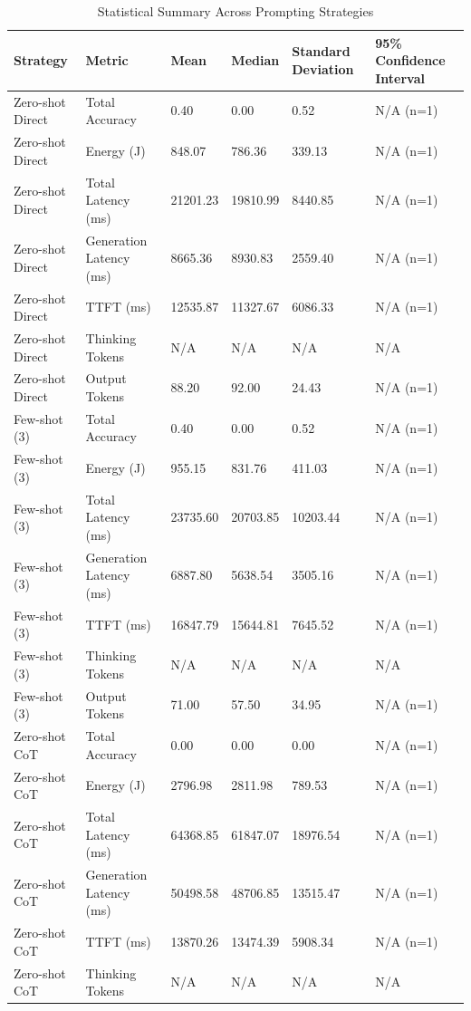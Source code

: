 \begin{table}
\caption{Statistical Summary Across Prompting Strategies}
\label{tab:statistical_summary}
\begin{tabular}{llllll}
\toprule
Strategy & Metric & Mean & Median & Standard Deviation & 95\% Confidence Interval \\
\midrule
Zero-shot Direct & Total Accuracy & 0.40 & 0.00 & 0.52 & N/A (n=1) \\
Zero-shot Direct & Energy (J) & 848.07 & 786.36 & 339.13 & N/A (n=1) \\
Zero-shot Direct & Total Latency (ms) & 21201.23 & 19810.99 & 8440.85 & N/A (n=1) \\
Zero-shot Direct & Generation Latency (ms) & 8665.36 & 8930.83 & 2559.40 & N/A (n=1) \\
Zero-shot Direct & TTFT (ms) & 12535.87 & 11327.67 & 6086.33 & N/A (n=1) \\
Zero-shot Direct & Thinking Tokens & N/A & N/A & N/A & N/A \\
Zero-shot Direct & Output Tokens & 88.20 & 92.00 & 24.43 & N/A (n=1) \\
Few-shot (3) & Total Accuracy & 0.40 & 0.00 & 0.52 & N/A (n=1) \\
Few-shot (3) & Energy (J) & 955.15 & 831.76 & 411.03 & N/A (n=1) \\
Few-shot (3) & Total Latency (ms) & 23735.60 & 20703.85 & 10203.44 & N/A (n=1) \\
Few-shot (3) & Generation Latency (ms) & 6887.80 & 5638.54 & 3505.16 & N/A (n=1) \\
Few-shot (3) & TTFT (ms) & 16847.79 & 15644.81 & 7645.52 & N/A (n=1) \\
Few-shot (3) & Thinking Tokens & N/A & N/A & N/A & N/A \\
Few-shot (3) & Output Tokens & 71.00 & 57.50 & 34.95 & N/A (n=1) \\
Zero-shot CoT & Total Accuracy & 0.00 & 0.00 & 0.00 & N/A (n=1) \\
Zero-shot CoT & Energy (J) & 2796.98 & 2811.98 & 789.53 & N/A (n=1) \\
Zero-shot CoT & Total Latency (ms) & 64368.85 & 61847.07 & 18976.54 & N/A (n=1) \\
Zero-shot CoT & Generation Latency (ms) & 50498.58 & 48706.85 & 13515.47 & N/A (n=1) \\
Zero-shot CoT & TTFT (ms) & 13870.26 & 13474.39 & 5908.34 & N/A (n=1) \\
Zero-shot CoT & Thinking Tokens & N/A & N/A & N/A & N/A \\

\end{tabular}
\end{table}
